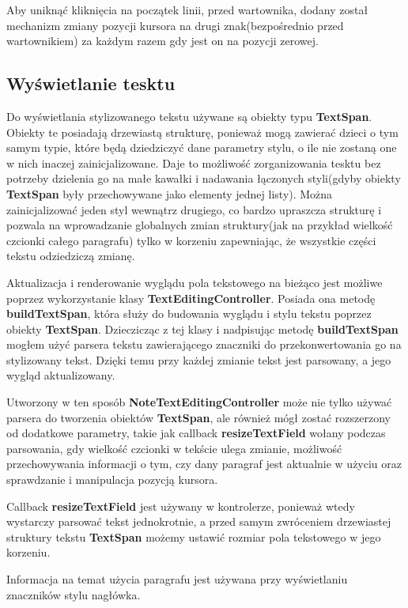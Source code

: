 Aby uniknąć kliknięcia na początek linii, przed wartownika, dodany został mechanizm zmiany pozycji kursora na drugi znak(bezpośrednio przed wartownikiem) za każdym razem gdy jest on na pozycji zerowej.

\subsection{Wyświetlanie tesktu}

Do wyświetlania stylizowanego tekstu używane są obiekty typu \textbf{TextSpan}. Obiekty te posiadają drzewiastą strukturę, ponieważ mogą zawierać dzieci o tym samym typie, które będą dziedziczyć dane parametry stylu, o ile nie zostaną one w nich inaczej zainicjalizowane. Daje to możliwość zorganizowania tesktu bez potrzeby dzielenia go na małe kawałki i nadawania łączonych styli(gdyby obiekty \textbf{TextSpan} były przechowywane jako elementy jednej listy). Można zainicjalizować jeden styl wewnątrz drugiego, co bardzo upraszcza strukturę i pozwala na wprowadzanie globalnych zmian struktury(jak na przykład wielkość czcionki całego paragrafu) tylko w korzeniu zapewniając, że wszystkie części tekstu odziedziczą zmianę.

Aktualizacja i renderowanie wyglądu pola tekstowego na bieżąco jest możliwe poprzez wykorzystanie klasy \textbf{TextEditingController}. Posiada ona metodę \textbf{buildTextSpan}, która służy do budowania wyglądu i stylu tekstu poprzez obiekty \textbf{TextSpan}. Dzieczicząc z tej klasy i nadpisując metodę \textbf{buildTextSpan} mogłem użyć parsera tekstu zawierającego znaczniki do przekonwertowania go na stylizowany tekst.
Dzięki temu przy każdej zmianie tekst jest parsowany, a jego wygląd aktualizowany.

Utworzony w ten sposób \textbf{NoteTextEditingController} może nie tylko używać parsera do tworzenia obiektów \textbf{TextSpan}, ale również mógł zostać rozszerzony od dodatkowe parametry, takie jak callback \textbf{resizeTextField} wołany podczas parsowania, gdy wielkość czcionki w tekście ulega zmianie, możliwość przechowywania informacji o tym, czy dany paragraf jest aktualnie w użyciu oraz sprawdzanie i manipulacja pozycją kursora. 

Callback \textbf{resizeTextField} jest używany w kontrolerze, ponieważ wtedy wystarczy parsować tekst jednokrotnie, a przed samym zwróceniem drzewiastej struktury tekstu \textbf{TextSpan} możemy ustawić rozmiar pola tekstowego w jego korzeniu.

Informacja na temat użycia paragrafu jest używana przy wyświetlaniu znaczników stylu nagłówka.

